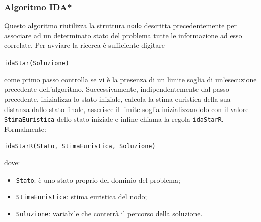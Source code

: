 \documentclass[a4paper,oneside,12pt]{book}
\def \code#1{\texttt{#1}}
\begin{document}
    \subsubsection{Algoritmo IDA*}
    Questo algoritmo riutilizza la struttura \code{nodo} descritta precedentemente per associare ad un determinato stato del problema tutte le informazione ad esso correlate.
    Per avviare la ricerca è sufficiente digitare
    \begin{center}
        \code{idaStar(Soluzione)}
    \end{center}
    come primo passo controlla se vi è la presenza di un limite soglia di un'esecuzione precedente dell'algoritmo. Successivamente, indipendentemente dal passo precedente, inizializza lo stato iniziale, calcola la stima euristica della sua distanza dallo stato finale, asserisce il limite soglia inizializzandolo con il valore \code{StimaEuristica} dello stato iniziale e infine chiama la regola \code{idaStarR}.
    Formalmente:
    \begin{center}
        \code{idaStarR(Stato, StimaEuristica, Soluzione)}
    \end{center}
    dove:
    \begin{itemize}
        \item \code{Stato}: è uno stato proprio del dominio del problema;
        \item \code{StimaEuristica}: stima euristica del nodo;
        \item \code{Soluzione}: variabile che conterrà il percorso della soluzione.
    \end{itemize}
\end{document}
